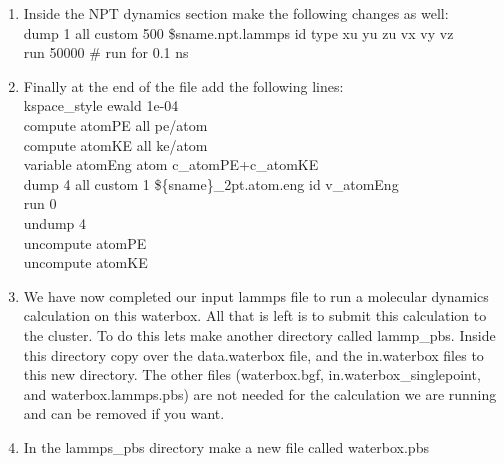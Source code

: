 \documentclass{article}
\begin{document}
\begin{enumerate}
\item Inside the NPT dynamics section make the following changes as well:\\
dump \hspace{10mm} 1 all custom  500 \${sname}.npt.lammps id type xu yu zu vx vy vz\\
run     \hspace{10mm}     50000 \# run for  0.1 ns\\

\item Finally at the end of the file add the following lines:\\
kspace\_style    ewald 1e-04\\
compute     \hspace{10mm}    atomPE all pe/atom\\
compute     \hspace{10mm}    atomKE all ke/atom\\
variable    \hspace{10mm}    atomEng atom c\_atomPE+c\_atomKE\\
dump        \hspace{12mm}    4 all custom 1 \$\{sname\}\_2pt.atom.eng id v\_atomEng\\
run         \hspace{15mm}    0\\
undump      \hspace{8mm}    4\\
uncompute   \hspace{6mm}    atomPE\\
uncompute   \hspace{6mm}    atomKE\\

\item We have now completed our input lammps file to run a molecular dynamics calculation on this waterbox.
All that is left is  to submit this calculation to the cluster. 
To do this lets make another directory called lammp\_pbs.
Inside this directory copy over the data.waterbox file, and the in.waterbox files to this new directory. 
The other files (waterbox.bgf, in.waterbox\_singlepoint, and waterbox.lammps.pbs) are not needed for the calculation we are running and can be removed if you want. \\

\item In the lammps\_pbs directory make a new file called waterbox.pbs


\end{enumerate}
\end{document}

